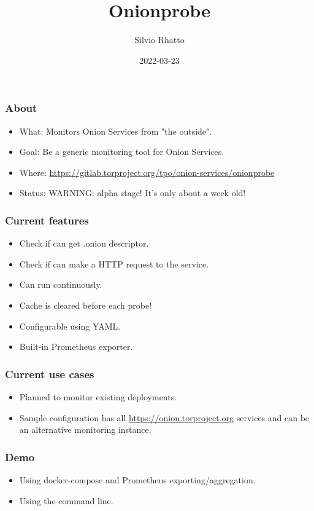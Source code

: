 \documentclass[aspectratio=169,12pt]{beamer}
\title{Onionprobe}
\author{Silvio Rhatto}
\date{2022-03-23}
\institute{}
\begin{document}
\begin{frame}
    \titlepage
\end{frame}

\begin{frame}
  \frametitle{About}
  \begin{itemize}
    \item What: Monitors Onion Services from "the outside".

    \item Goal: Be a generic monitoring tool for Onion Services.

    \item Where: \href{https://gitlab.torproject.org/tpo/onion-services/onionprobe/}{https://gitlab.torproject.org/tpo/onion-services/onionprobe}

    \item Status: WARNING: alpha stage! It's only about a week old!
  \end{itemize}
\end{frame}

\begin{frame}
  \frametitle{Current features}

  \begin{itemize}
    \item Check if can get .onion descriptor.
    \item Check if can make a HTTP request to the service.
    \item Can run continuously.
    \item Cache is cleared before each probe!
    \item Configurable using YAML.
    \item Built-in Prometheus exporter.
  \end{itemize}
\end{frame}

\begin{frame}
  \frametitle{Current use cases}

  \begin{itemize}
    \item
      Planned to monitor existing deployments.
    \item
      Sample configuration has all
      \href{https://onion.torproject.org}{https://onion.torproject.org}
      services and can be an alternative monitoring instance.
  \end{itemize}
\end{frame}

\begin{frame}
  \frametitle{Demo}

  \begin{itemize}
    \item Using docker-compose and Prometheus exporting/aggregation.
    \item Using the command line.
  \end{itemize}
\end{frame}
\end{document}

